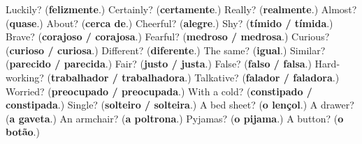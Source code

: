 \begin{tcolorbox}[breakable,colback=teal!4,colframe=teal!35!black,title={Before you move on}]
Luckily? (\textbf{felizmente}.) Certainly? (\textbf{certamente}.) Really? (\textbf{realmente}.) Almost? (\textbf{quase}.) About? (\textbf{cerca de}.) Cheerful? (\textbf{alegre}.) Shy? (\textbf{tímido / tímida}.) Brave? (\textbf{corajoso / corajosa}.) Fearful? (\textbf{medroso / medrosa}.) Curious? (\textbf{curioso / curiosa}.) Different? (\textbf{diferente}.) The same? (\textbf{igual}.) Similar? (\textbf{parecido / parecida}.) Fair? (\textbf{justo / justa}.) False? (\textbf{falso / falsa}.) Hard-working? (\textbf{trabalhador / trabalhadora}.) Talkative? (\textbf{falador / faladora}.) Worried? (\textbf{preocupado / preocupada}.) With a cold? (\textbf{constipado / constipada}.) Single? (\textbf{solteiro / solteira}.) A bed sheet? (\textbf{o lençol}.) A drawer? (\textbf{a gaveta}.) An armchair? (\textbf{a poltrona}.) Pyjamas? (\textbf{o pijama}.) A button? (\textbf{o botão}.)
\end{tcolorbox}
